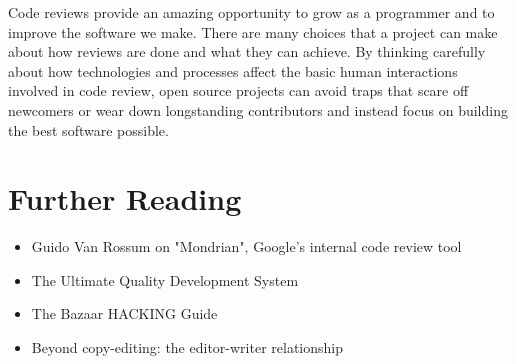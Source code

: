 \documentclass{article}
\begin{document}
Code reviews provide an amazing opportunity to grow as a programmer and to improve the software we make. There are many choices that a project can make about how reviews are done and what they can achieve. By thinking carefully about how technologies and processes affect the basic human interactions involved in code review, open source projects can avoid traps that scare off newcomers or wear down longstanding contributors and instead focus on building the best software possible.


\section{Further Reading}

\begin{itemize}
 \item{Guido Van Rossum on "Mondrian", Google's internal code review tool}
 \item{The Ultimate Quality Development System}
 \item{The Bazaar HACKING Guide}
 \item{Beyond copy-editing: the editor-writer relationship}
\end{itemize}
\end{document}
